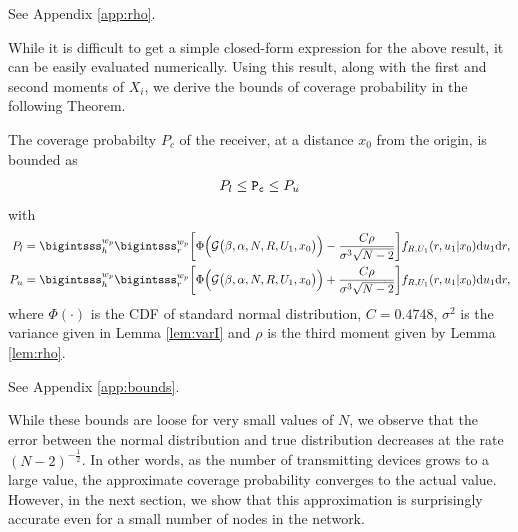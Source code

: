 \documentclass[journal,draftclsnofoot,onecolumn,12pt]{IEEEtran}
\begin{document}
\begin{IEEEproof}
See Appendix \ref{app:rho}.
\end{IEEEproof}
While it is difficult to get a simple closed-form expression for the above result, it can be easily evaluated numerically. Using this result, along with the first and second moments of $X_i$, we derive the bounds of coverage probability in the following Theorem.


\begin{thm}\label{thm:bounds}
The coverage probabilty $P_c$ of the receiver, at a distance $x_0$ from the origin, is bounded as
\begin{align*}
P_l \leq \mathtt{P_c} \leq P_u
\end{align*}
with
\begin{align}
P_l = \bigintsss_h^{w_p} \bigintsss_r^{w_p} \bigg[\Phi \Big( \calG\big(\T, \alpha, N, R,U_1, x_0\big)  \Big) - \frac{C\rho}{\sigma^3 \sqrt{N-2}} \bigg] f_{R, U_1}(r, u_1|x_0) {\rm d}u_1 {\rm d}r, \\
P_u = \bigintsss_h^{w_p} \bigintsss_r^{w_p} \bigg[\Phi \Big( \calG\big(\T, \alpha, N, R,U_1, x_0\big) \Big) + \frac{C\rho}{\sigma^3 \sqrt{N-2}} \bigg] f_{R, U_1}(r, u_1|x_0) {\rm d}u_1 {\rm d}r,
\end{align}
where $\Phi(\cdot)$ is the CDF of standard normal distribution, $C = 0.4748$, $\sigma^2$ is the variance given in Lemma \ref{lem:varI} and $\rho$ is the third moment given by Lemma \ref{lem:rho}.
\end{thm}
\begin{IEEEproof}
See Appendix \ref{app:bounds}.
\end{IEEEproof}
While these bounds are loose for very small values of $N$, we observe that the error between the normal distribution and true distribution decreases at the rate $(N-2)^{-\frac{1}{2}}$. In other words, as the number of transmitting devices grows to a large value, the approximate coverage probability converges to the actual value. However, in the next section, we show that this approximation is surprisingly accurate even for a small number of nodes in the network.
\end{document}
